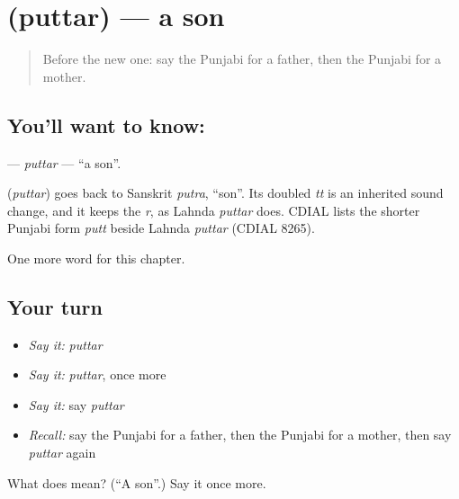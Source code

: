 \section[\texorpdfstring{\pa{ਪੁੱਤਰ} (puttar)}{ਪੁੱਤਰ (puttar)}]{ (puttar) — a son}

\label{lesson:PA-C53-puttar}



\begin{quote}
Before the new one: say the Punjabi for a father, then the Punjabi for a mother.
\end{quote}

\subsection*{You'll want to know: }
\textbf{} — \emph{puttar} — \textquotedblleft{}a son\textquotedblright{}.

\begin{cousinweb}
\textbf{} (\emph{puttar}) goes back to Sanskrit \emph{putra}, \textquotedblleft{}son\textquotedblright{}. Its doubled \emph{tt} is an inherited sound change, and it keeps the \emph{r}, as Lahnda \emph{puttar} does. CDIAL lists the shorter Punjabi form \emph{putt} beside Lahnda \emph{puttar} (CDIAL 8265).
\end{cousinweb}

\begin{grammarlens}[title={What you've built}]
One more word for this chapter.
\end{grammarlens}

\subsection*{Your turn}
\begin{itemize}
\raggedright
  \item \emph{Say it:} \emph{puttar}
  \item \emph{Say it:} \emph{puttar}, once more
  \item \emph{Say it:} say \emph{puttar}
  \item \emph{Recall:} say the Punjabi for a father, then the Punjabi for a mother, then say \emph{puttar} again
\end{itemize}

\begin{tcolorbox}[breakable,colback=teal!4,colframe=teal!35!black,title={Before you move on}]
What does  mean? (\textquotedblleft{}A son\textquotedblright{}.) Say it once more.
\end{tcolorbox}
